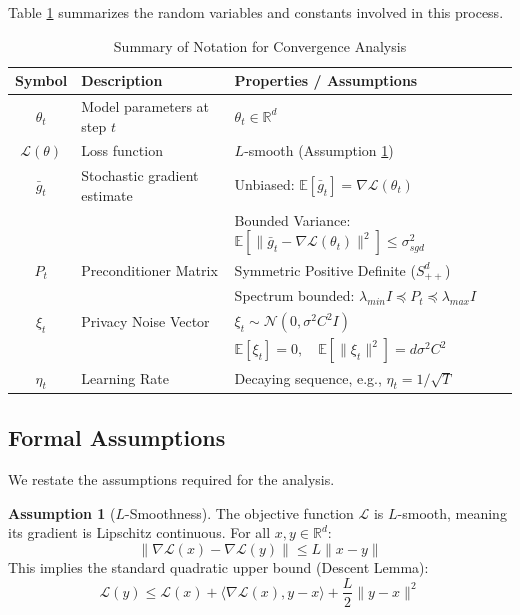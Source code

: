 \documentclass{article}
\theoremstyle{plain}
\theoremstyle{definition}
\newtheorem{assumption}[theorem]{Assumption}
\theoremstyle{remark}
\begin{document}
Table \ref{tab:notation} summarizes the random variables and constants involved in this process.

\begin{table}[ht]
    \centering
    \caption{Summary of Notation for Convergence Analysis}
    \label{tab:notation}
    \renewcommand{\arraystretch}{1.3}
    \begin{tabular}{c|l|l}
        \hline
        \textbf{Symbol} & \textbf{Description} & \textbf{Properties / Assumptions} \\
        \hline
        $\theta_t$ & Model parameters at step $t$ & $\theta_t \in \mathbb{R}^d$ \\
        $\mathcal{L}(\theta)$ & Loss function & $L$-smooth (Assumption \ref{ass:smoothness}) \\
        $\bar{g}_t$ & Stochastic gradient estimate & Unbiased: $\mathbb{E}[\bar{g}_t] = \nabla \mathcal{L}(\theta_t)$ \\
         & & Bounded Variance: $\mathbb{E}[\|\bar{g}_t - \nabla \mathcal{L}(\theta_t)\|^2] \le \sigma_{sgd}^2$ \\
        $P_t$ & Preconditioner Matrix & Symmetric Positive Definite ($S_{++}^d$) \\
         & & Spectrum bounded: $\lambda_{min} I \preceq P_t \preceq \lambda_{max} I$ \\
        $\xi_t$ & Privacy Noise Vector & $\xi_t \sim \mathcal{N}(0, \sigma^2 C^2 I)$ \\
         & & $\mathbb{E}[\xi_t] = 0, \quad \mathbb{E}[\|\xi_t\|^2] = d \sigma^2 C^2$ \\
        $\eta_t$ & Learning Rate & Decaying sequence, e.g., $\eta_t = 1/\sqrt{T}$ \\
        \hline
    \end{tabular}
\end{table}

\subsection{Formal Assumptions}

We restate the assumptions required for the analysis.

\begin{assumption}[$L$-Smoothness]
\label{ass:smoothness}
The objective function $\mathcal{L}$ is $L$-smooth, meaning its gradient is Lipschitz continuous. For all $x, y \in \mathbb{R}^d$:
\begin{equation}
    \|\nabla \mathcal{L}(x) - \nabla \mathcal{L}(y)\| \le L \|x - y\|
\end{equation}
This implies the standard quadratic upper bound (Descent Lemma):
\begin{equation}
    \mathcal{L}(y) \le \mathcal{L}(x) + \langle \nabla \mathcal{L}(x), y - x \rangle + \frac{L}{2} \|y - x\|^2
\end{equation}
\end{assumption}
\end{document}
